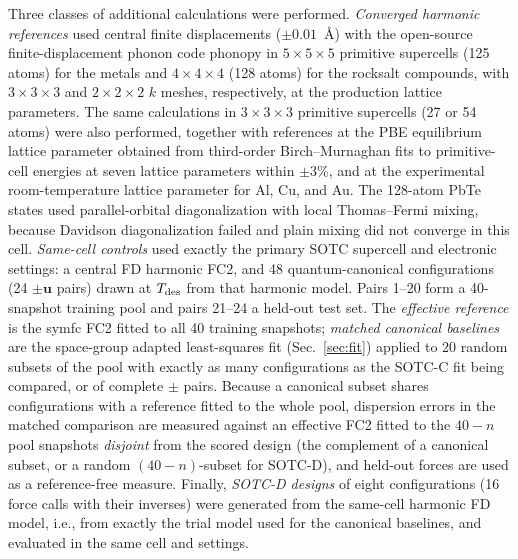 \documentclass[aip,jap,reprint,amsmath,amssymb,floatfix]{revtex4-2}
\begin{document}
Three classes of additional calculations were performed.
\textit{Converged harmonic references} used central finite displacements
($\pm0.01$~\AA) with the open-source finite-displacement phonon code phonopy
\cite{ref53} in $5\times5\times5$ primitive
supercells (125 atoms) for the metals and $4\times4\times4$ (128 atoms) for the
rocksalt compounds, with $3\times3\times3$ and $2\times2\times2$ $k$ meshes,
respectively, at the production lattice parameters. The same calculations in
$3\times3\times3$ primitive supercells (27 or 54 atoms) were also performed,
together with references at the PBE equilibrium lattice parameter obtained from
third-order Birch--Murnaghan fits to primitive-cell energies at seven
lattice parameters within $\pm3$\%, and at the experimental
room-temperature lattice parameter for Al, Cu, and Au. The 128-atom PbTe
states used parallel-orbital diagonalization with local Thomas--Fermi
mixing, because Davidson diagonalization failed and plain mixing did not
converge in this cell.
\textit{Same-cell controls} used exactly the primary SOTC supercell and
electronic settings: a central FD harmonic FC2, and 48 quantum-canonical
configurations (24 $\pm\mathbf u$ pairs) drawn at $T_{\rm des}$ from that
harmonic model. Pairs 1--20 form a 40-snapshot training pool and pairs 21--24 a
held-out test set. The \textit{effective reference} is the symfc FC2 fitted to
all 40 training snapshots; \textit{matched canonical baselines} are the
space-group adapted least-squares fit (Sec.~\ref{sec:fit}) applied to 20 random subsets of the pool with exactly as
many configurations as the SOTC-C fit being compared, or of complete $\pm$
pairs. Because a canonical subset shares configurations with a reference
fitted to the whole pool, dispersion errors in the matched comparison are
measured against an effective FC2 fitted to the $40-n$ pool snapshots
\emph{disjoint} from the scored design (the complement of a canonical subset,
or a random $(40-n)$-subset for SOTC-D), and held-out forces are used as a
reference-free measure. Finally, \textit{SOTC-D designs} of eight
configurations (16 force calls with their inverses) were generated from the
same-cell harmonic FD model, i.e., from exactly the trial model used for the
canonical baselines, and evaluated in the same cell and settings.
\end{document}
